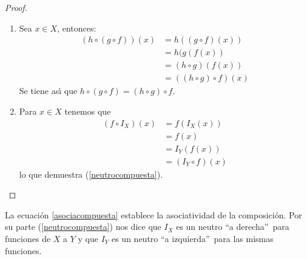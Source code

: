 \begin{proof}
\hfil


\begin{enumerate}
\item Sea $x\in X$, entonces:
\begin{align*}
(h\circ(g\circ f))(x)  &  =h((g\circ f)(x))\\
&  =h(g(f(x))\\
&  =(h\circ g)(f(x))\\
&  =((h\circ g)\circ f)(x)
\end{align*}
Se tiene as\'{\i} que $h\circ(g\circ f)=(h\circ g)\circ f$.

\item Para $x\in X$ tenemos que
\begin{align*}
(f\circ I_{X})(x)  &  =f(I_{X}(x))\\
&  =f(x)\\
&  =I_{Y}(f(x))\\
&  =(I_{Y}\circ f)(x)
\end{align*}
lo que demuestra (\ref{neutrocompuesta}).
\end{enumerate}
\end{proof}

La ecuaci\'{o}n \ref{asociacompuesta} establece la asociatividad de la
composici\'{o}n. Por su parte (\ref{neutrocompuesta}) nos dice que $I_{X}$ es
un neutro \textquotedblleft a derecha\textquotedblright\ para funciones de $X$
a $Y$ y que $I_{Y}$ es un neutro \textquotedblleft a
izquierda\textquotedblright\ para las mismas funciones.

